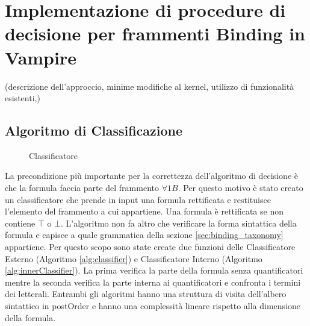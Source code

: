 \documentclass[./main.tex]{subfiles}
\begin{document}
\newcommand{\ob}{\textit{1B} }
\newcommand{\fb}{$\forall$\textit{1B} }
\newcommand{\cb}{\textit{CB} }
\newcommand{\dbb}{\textit{DB} }

\chapter{Implementazione di procedure di decisione per frammenti Binding in Vampire}

(descrizione dell'approccio, minime modifiche al kernel, utilizzo di funzionalità esistenti,)

\section{Algoritmo di Classificazione}

\begin{figure}[H]
    \centering
    \scalebox{0.55}{
        
    }
    \caption{Classificatore}
    \label{fig:classifier}
\end{figure}

La precondizione più importante per la correttezza dell'algoritmo di decisione è che la formula faccia parte del frammento $\forall1B$.
Per questo motivo è stato creato un classificatore che prende in input una formula rettificata e restituisce l'elemento del frammento a cui appartiene.
Una formula è rettificata se non contiene $\top$ o $\bot$. 
L'algoritmo non fa altro che verificare la forma sintattica della formula e capisce a quale grammatica della sezione \ref{sec:binding_taxonomy}
appartiene. Per questo scopo sono state create due funzioni delle Classificatore Esterno (Algoritmo \ref{alg:classifier}) e Classificatore Interno (Algoritmo \ref{alg:innerClassifier}).
La prima verifica la parte della formula senza quantificatori mentre la seconda verifica la parte interna ai quantificatori e confronta 
i termini dei letterali. 
Entrambi gli algoritmi hanno una struttura di visita dell'albero sintattico in postOrder e hanno una complessità lineare rispetto alla dimensione della formula.
\end{document}
